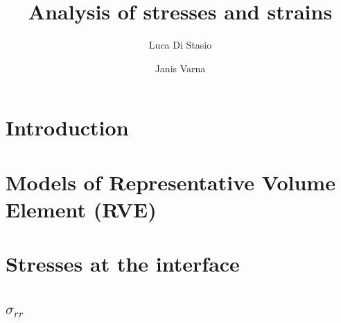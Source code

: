 \documentclass[review]{elsarticle}
\begin{document}
\begin{frontmatter}

\title{Analysis of stresses and strains}


\author[lulea]{Luca Di Stasio}
\author[lulea]{Janis Varna}


\address[lulea]{Lule\aa\ University of Technology, University Campus, SE-97187 Lule\aa, Sweden}

\begin{abstract}

\end{abstract}


\end{frontmatter}

\linenumbers

\section{Introduction}

\section{Models of Representative Volume Element (RVE)}

\section{Stresses at the interface}

\subsection{$\sigma_{rr}$}
\end{document}
